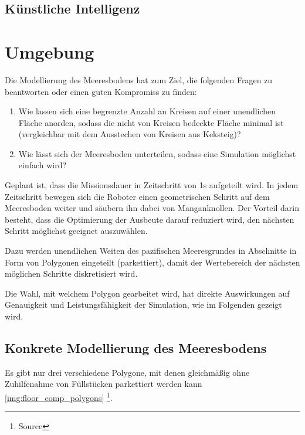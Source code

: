 \documentclass{article}
\begin{document}
\subsection{Künstliche Intelligenz}



\clearpage
\section{Umgebung}

Die Modellierung des Meeresbodens hat zum Ziel, die folgenden 
Fragen zu beantworten oder einen guten Kompromiss zu finden:

\begin{enumerate}
\item Wie lassen sich eine begrenzte Anzahl an Kreisen auf einer 
unendlichen Fläche anorden, sodass die nicht von Kreisen bedeckte Fläche minimal 
ist (vergleichbar mit dem Ausstechen von Kreisen aus Keksteig)?
\item Wie lässt sich der Meeresboden unterteilen, sodass eine Simulation
möglichst einfach wird?
\end{enumerate}

Geplant ist, dass die Missionsdauer in Zeitschritt von 1s aufgeteilt wird.
In jedem Zeitschritt bewegen sich die Roboter einen geometrischen Schritt
auf dem Meeresboden weiter und säubern ihn dabei von Manganknollen. Der Vorteil
darin besteht, dass die Optimierung der Ausbeute darauf reduziert wird, 
den nächsten Schritt möglichst geeignet auszuwählen.

Dazu werden unendlichen Weiten des pazifischen Meeresgrundes
in Abschnitte in Form von Polygonen eingeteilt (parkettiert),
damit der Wertebereich der nächsten möglichen Schritte diskretisiert wird.

Die Wahl, mit welchem Polygon gearbeitet wird, hat direkte
Auswirkungen auf Genauigkeit und Leistungsfähigkeit der 
Simulation, wie im Folgenden gezeigt wird.

\subsection{Konkrete Modellierung des Meeresbodens}

Es gibt nur drei verschiedene Polygone, mit denen gleichmäßig
ohne Zuhilfenahme von Füllstücken parkettiert werden kann 
\ref{img:floor_comp_polygons} \footnote{Source}.
\end{document}
